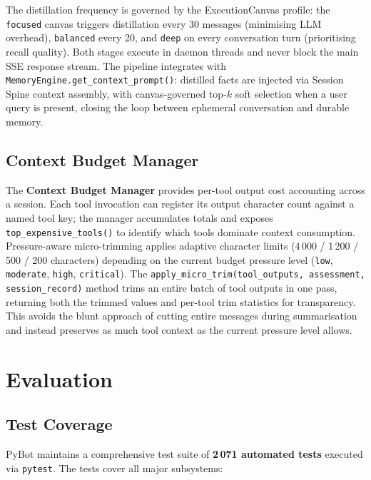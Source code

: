 \documentclass[11pt,a4paper]{article}
\begin{document}
The distillation frequency is governed by the ExecutionCanvas profile: the \texttt{focused} canvas triggers distillation every 30 messages (minimising LLM overhead), \texttt{balanced} every 20, and \texttt{deep} on every conversation turn (prioritising recall quality).
Both stages execute in daemon threads and never block the main SSE response stream.
The pipeline integrates with \texttt{MemoryEngine.get\_context\_prompt()}: distilled facts are injected via Session Spine context assembly, with canvas-governed top-$k$ soft selection when a user query is present, closing the loop between ephemeral conversation and durable memory.

\subsection{Context Budget Manager}
The \textbf{Context Budget Manager} provides per-tool output cost accounting across a session.
Each tool invocation can register its output character count against a named tool key; the manager accumulates totals and exposes \texttt{top\_expensive\_tools()} to identify which tools dominate context consumption.
Pressure-aware micro-trimming applies adaptive character limits (4\,000 / 1\,200 / 500 / 200 characters) depending on the current budget pressure level (\texttt{low}, \texttt{moderate}, \texttt{high}, \texttt{critical}).
The \texttt{apply\_micro\_trim(tool\_outputs, assessment, session\_record)} method trims an entire batch of tool outputs in one pass, returning both the trimmed values and per-tool trim statistics for transparency.
This avoids the blunt approach of cutting entire messages during summarisation and instead preserves as much tool context as the current pressure level allows.

\section{Evaluation}
\label{sec:eval}

\subsection{Test Coverage}

PyBot maintains a comprehensive test suite of \textbf{2\,071 automated tests} executed via \texttt{pytest}.
The tests cover all major subsystems:
\end{document}
